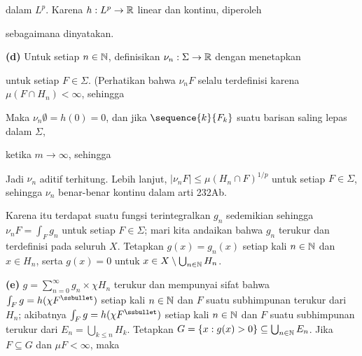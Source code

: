 {\noindent dalam $L^p$. Karena $h:L^p\to\Bbb R$ linear dan kontinu,
diperoleh


\noindent sebagaimana dinyatakan.\ \Qed

\medskip

{\bf (d)} Untuk setiap $n\in\Bbb N$, definisikan
$\nu_n:\Sigma\to\Bbb R$ dengan menetapkan


\noindent untuk setiap $F\in\Sigma$. (Perhatikan bahwa $\nu_nF$ selalu
terdefinisi karena $\mu(F\cap H_n)<\infty$, sehingga


\noindent Maka $\nu_n\emptyset=h(0)=0$, dan jika
$\sequence{k}{F_k}$ suatu barisan saling lepas dalam $\Sigma$,


\noindent ketika $m\to\infty$, sehingga


\noindent Jadi $\nu_n$ aditif terhitung. Lebih lanjut,
$|\nu_nF|\le\mu(H_n\cap F)^{1/p}$ untuk setiap $F\in\Sigma$, sehingga
$\nu_n$ benar-benar kontinu dalam arti 232Ab.

Karena itu terdapat suatu fungsi terintegralkan $g_n$ sedemikian sehingga
$\nu_nF=\int_Fg_n$ untuk setiap $F\in\Sigma$; mari kita andaikan bahwa
$g_n$ terukur dan terdefinisi pada seluruh $X$. Tetapkan $g(x)=g_n(x)$
setiap kali $n\in\Bbb N$ dan $x\in H_n$, serta $g(x)=0$ untuk
$x\in X\setminus\bigcup_{n\in\Bbb N}H_n$.

\medskip

{\bf (e)} $g=\sum_{n=0}^{\infty}g_n\times\chi H_n$ terukur dan
mempunyai sifat bahwa $\int_Fg=h(\chi F^{\ssbullet})$ setiap kali
$n\in\Bbb N$ dan $F$ suatu subhimpunan terukur dari $H_n$; akibatnya
$\int_Fg=h(\chi F^{\ssbullet})$ setiap kali $n\in\Bbb N$ dan $F$ suatu
subhimpunan terukur dari $E_n=\bigcup_{k\le n}H_k$. Tetapkan
$G=\{x:g(x)>0\}\subseteq\bigcup_{n\in\Bbb N}E_n$. Jika $F\subseteq G$
dan $\mu F<\infty$, maka


}
